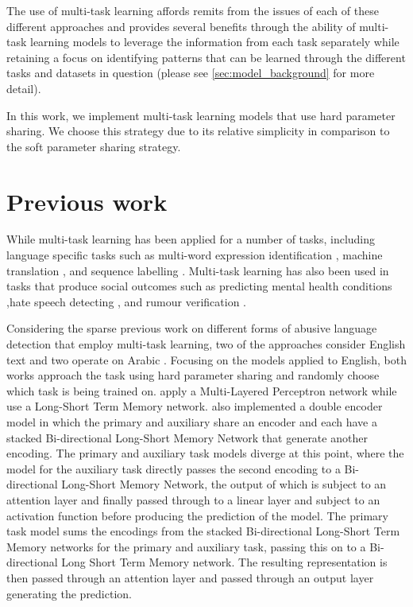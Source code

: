 
The use of multi-task learning affords remits from the issues of each of these different approaches and provides several benefits through the ability of multi-task learning models to leverage the information from each task separately while retaining a focus on identifying patterns that can be learned through the different tasks and datasets in question (please see \autoref{sec:model_background} for more detail).

In this work, we implement multi-task learning models that use hard parameter sharing. We choose this strategy due to its relative simplicity in comparison to the soft parameter sharing strategy.

\section{Previous work}

While multi-task learning has been applied for a number of tasks, including language specific tasks such as multi-word expression identification \cite{Bingel-Bjerva:2018}, machine translation \cite{Dong:2015}, and sequence labelling \cite{Rei:2017}. Multi-task learning has also been used in tasks that produce social outcomes such as predicting mental health conditions \cite{Benton:2017},hate speech detecting \cite{Waseem:2018,Rajamanickam:2020,Farha:2020,Djandji:2019}, and rumour verification \cite{Kochkina:2018}.

Considering the sparse previous work on different forms of abusive language detection that employ multi-task learning, two of the approaches consider English text \cite{Waseem:2018,Rajamanickam:2020} and two operate on Arabic \cite{Farha:2020,Djandji:2019}. Focusing on the models applied to English, both works approach the task using hard parameter sharing \cite{Caruana:1997} and randomly choose which task is being trained on. \citet{Waseem:2018} apply a Multi-Layered Perceptron network while \citet{Rajamanickam:2020} use a Long-Short Term Memory network. \citet{Rajamanickam:2020} also implemented a double encoder model in which the primary and auxiliary share an encoder and each have a stacked Bi-directional Long-Short Memory Network that generate another encoding. The primary and auxiliary task models diverge at this point, where the model for the auxiliary task directly passes the second encoding to a Bi-directional Long-Short Memory Network, the output of which is subject to an attention layer and finally passed through to a linear layer and subject to an activation function before producing the prediction of the model. The primary task model sums the encodings from the stacked Bi-directional Long-Short Term Memory networks for the primary and auxiliary task, passing this on to a Bi-directional Long Short Term Memory network. The resulting representation is then passed through an attention layer and passed through an output layer generating the prediction. 

